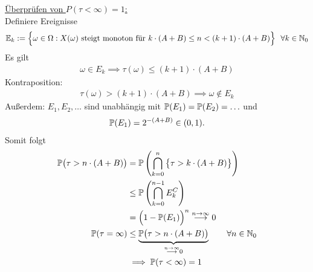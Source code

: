 \begin{beisp}
\underline{Überprüfen von $P(\tau<\infty)=1$:}\\
Definiere Ereignisse
\begin{align*}
\E_k:=\Big\lbrace\omega\in\Omega:X(\omega)\text{ steigt monoton für }k\cdot(A+B)\leq n<(k+1)\cdot(A+B)\Big\rbrace~~\forall k\in\N_0
\end{align*}
Es gilt
\begin{align*}
\omega\in E_k\implies \tau(\omega)\leq(k+1)\cdot(A+B)
\end{align*}
Kontraposition:
\begin{align*}
\tau(\omega)>(k+1)\cdot(A+B)\implies\omega\not\in E_k
\end{align*}
Außerdem: $E_1,E_2,\ldots$ sind unabhängig mit $\P(E_1)=\P(E_2)=\ldots$ und
\begin{align*}
\P(E_1)=2^{-(A+B)}\in(0,1).
\end{align*}
Somit folgt
\begin{align*}
\P\big(\tau>n\cdot(A+B)\big)&=\P\left(\bigcap\limits_{k=0}^n\big\lbrace\tau > k\cdot (A+B)\big\rbrace\right)\\
&\leq\P\left(\bigcap\limits_{k=0}^{n-1} E_k^C\right)\\
&=\Big(1-\P(E_1)\Big)^n\stackrel{n\to\infty}{\longrightarrow}0\\
\P(\tau=\infty)&\leq\underbrace{\P\big(\tau> n\cdot(A+B)\big)}_{\stackrel{n\to\infty}{\longrightarrow}0}\qquad\forall n\in\N_0\\
&\implies
\P(\tau<\infty)=1
\end{align*}
\end{beisp}




